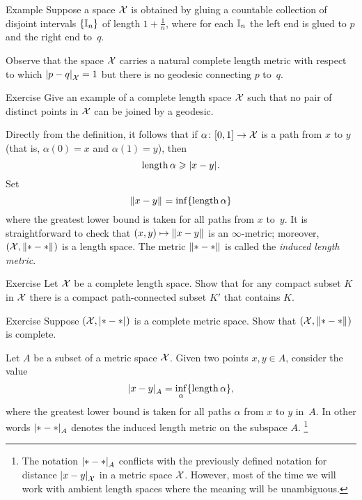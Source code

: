 \begin{thm}{Example}
Suppose a space $\mathcal{X}$ is obtained by gluing a countable collection of disjoint intervals $\{\mathbb{I}_n\}$ of length $1+\tfrac1n$, where for each $\mathbb{I}_n$ the left end is glued to $p$ and the right end to~$q$.

Observe that the space $\mathcal{X}$ carries a natural complete length metric with respect to which $\dist{p}{q}{\spc{X}}=1$ but there is no geodesic connecting $p$ to~$q$.
\end{thm}

\begin{thm}{Exercise}\label{ex:no-geod}
Give an example of a complete length space $\mathcal{X}$ such that no pair of distinct points in $\mathcal{X}$ can be joined by a geodesic.
\end{thm}

Directly from the definition, it follows that if $\alpha\colon[0,1]\to\mathcal{X}$ is a path from $x$ to $y$ 
(that is, $\alpha(0)=x$ and $\alpha(1)=y$), then 
\[\length\alpha\ge \dist{x}{y}{}.\]
Set 
\[\yetdist{x}{y}{}=\inf\{\length\alpha\}\]
where the greatest lower bound is taken for all paths from $x$ to~$y$.
It is straightforward to check that $(x,y)\mapsto \yetdist{x}{y}{}$ is an $\infty$-metric; moreover, $(\spc{X},\yetdist{*}{*}{})$ is a length space.
The metric $\yetdist{*}{*}{}$ is called the \emph{induced length metric}.

\begin{thm}{Exercise}\label{ex:compact+connceted}
Let $\mathcal{X}$ be a complete length space.
Show that for any compact subset $K$ in $\mathcal{X}$
there is a compact path-connected subset $K'$ that contains $K$.  
\end{thm}

\begin{thm}{Exercise}\label{ex:compact=>complete}
Suppose $(\spc{X},\dist{*}{*}{})$ is a complete metric space.
Show that $(\spc{X},\yetdist{*}{*}{})$ is complete.
\end{thm}

Let $A$ be a subset of a metric space $\mathcal{X}$.
Given two points $x,y\in A$,
consider the value
\[\dist{x}{y}{A}=\inf_{\alpha}\{\length\alpha\},\]
where the greatest lower bound is taken for all paths $\alpha$ from $x$ to $y$ in~$A$.
In other words $\dist{*}{*}{A}$ denotes the induced length metric on the subspace $A$.%
\footnote{The notation $\dist{*}{*}{A}$ conflicts with the previously defined notation for distance $\dist{x}{y}{\spc{X}}$ in a metric space $\mathcal{X}$. However, most of the time we will work with ambient length spaces where the meaning will be unambiguous.}

